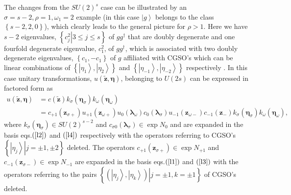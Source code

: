 \documentclass[12pt,aps,amsfonts,amssymb,tightenlines]{revtex4}%
\begin{document}
The changes from the $SU\left(  2\right)  ^{s}$ case can be illustrated by an
$\sigma=s-2,\rho=1,\omega_{1}=2$ example (in this case $\left\vert
g\right\rangle $ belongs to the class $\left\{  s-2,2,0\right\}  $), which
clearly leads to the general picture for $\rho>1$. Here we have $s-2$
eigenvalues, $\left\{  \left.  c_{j}^{2}\right\vert 3\leq j\leq s\right\}  $
of $gg^{\dag}$ that are doubly degenerate and one fourfold degenerate
eigenvalue, $c_{1}^{2}$, of $gg^{\dag}$, which is associated with two doubly
degenerate eigenvalues, $\left\{  c_{1},-c_{1}\right\}  $ of $g$ affiliated
with CGSO's which can be linear combinations of $\left\{  \left\vert \eta
_{1}\right\rangle ,\left\vert \eta_{2}\right\rangle \right\}  $ and $\left\{
\left\vert \eta_{-1}\right\rangle ,\left\vert \eta_{-2}\right\rangle \right\}
$ respectively \cite{Weiner&ortiz04}. In this case unitary transformations,
$u\left(  \mathbf{\tilde{z},\eta}\right)  $, belonging to $U\left(  2s\right)
$ can be expressed in factored form as
\begin{align}
u\left(  \mathbf{\tilde{z},\eta}\right)   &  =c\left(  \mathbf{\tilde{z}%
}\right)  k_{\sigma}\left(  \mathbf{\eta}_{\sigma}\right)  k_{\omega}\left(
\mathbf{\eta}_{\omega}\right) \nonumber\\
&  =c_{+1}\left(  \mathbf{z}_{\sigma+}\right)  u_{+1}\left(  \mathbf{z}%
_{\omega+}\right)  u_{0}\left(  \mathbf{\lambda}_{\omega}\right)  c_{0}\left(
\mathbf{\lambda}_{\sigma}\right)  u_{-1}\left(  \mathbf{z}_{\omega-}\right)
c_{-1}\left(  \mathbf{z}_{-}\right)  k_{\sigma}\left(  \mathbf{\eta}_{\sigma
}\right)  k_{\omega}\left(  \mathbf{\eta}_{\omega}\right)  , \label{gpprod}%
\end{align}
where $k_{\sigma}\left(  \mathbf{\eta}_{\sigma}\right)  \in SU\left(
2\right)  ^{s-2}$ and $c_{\sigma0}\left(  \mathbf{\lambda}_{\sigma}\right)
\in\exp N_{0}$ and are expanded in the basis eqs.$\left(  \ref{l2}\right)  $
and $\left(  \ref{l4}\right)  $ respectively with the operators referring to
CGSO's $\left\{  \left.  \left\vert \eta_{j}\right\rangle \right\vert
j=\pm1,\pm2\right\}  $ deleted. The operators $c_{+1}\left(  \mathbf{z}%
_{\sigma+}\right)  \in\exp N_{+1}$ and $c_{-1}\left(  \mathbf{z}_{\sigma
-}\right)  \in\exp N_{-1}$ are expanded in the basis eqs.$\left(
\ref{l1}\right)  $ and $\left(  \ref{l3}\right)  $ with the operators
referring to the pairs $\left\{  \left.  \left(  \left\vert \eta
_{j}\right\rangle ,\left\vert \eta_{k}\right\rangle \right)  \right\vert
j=\pm1,k=\pm1\right\}  $ of CGSO's deleted.
\end{document}
